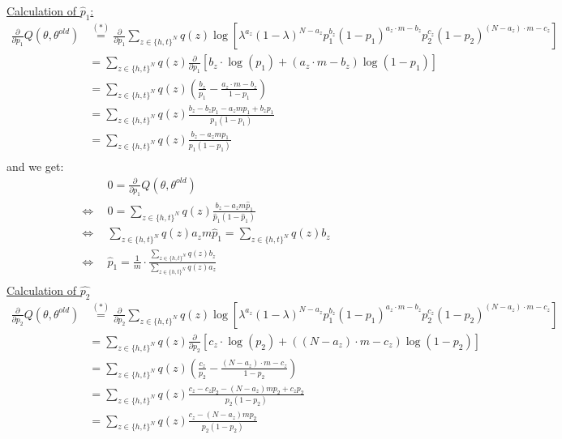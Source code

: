 \documentclass{article}
\begin{document}
\underline{Calculation of $\hat{p}_1$:}
\begin{align*}
\frac{\partial}{\partial p_1}Q(\theta,\theta^{old})& \stackrel{(*)}{=}  \frac{\partial}{\partial p_1} \sum \limits _{z \in \{h, t\}^N} q(z)\log [ 
\lambda^{a_z} (1  - \lambda)^{N - a_z} p_1^{b_z}(1 - p_1)^{a_z \cdot m - b_z} p_2^{c_z}(1 - p_2)^{(N - a_z) \cdot m - c_z} ]&\\
&=  \sum \limits _{z \in \{h, t\}^N} q(z) \frac{\partial}{\partial p_1} [ b_z \cdot \log( 
p_1) + (a_z \cdot m - b_z)\log(1  - p_1) ]\\
&=  \sum \limits _{z \in \{h, t\}^N} q(z) \left ( \frac{b_z }{p_1}  - \frac{a_z \cdot m - b_z}{1- p_1} \right )\\
&=  \sum \limits _{z \in \{h, t\}^N} q(z)  \frac{b_z - b_z p_1 - a_z m p_1 + b_z p_1}{p_1(1- p_1)}\\
&=  \sum \limits _{z \in \{h, t\}^N} q(z)  \frac{b_z - a_z m p_1 }{p_1(1- p_1)}\\
\end{align*}
and we get:\\
\begin{align*}
                 &0 =  \frac{\partial}{\partial p_1}Q(\theta,\theta^{old}) &\\
\Leftrightarrow ~~&0 = \sum \limits _{z \in \{h, t\}^N} q(z)  \frac{b_z - a_z m \hat{p}_1}{\hat{p}_1(1- \hat{p}_1)}\\
\Leftrightarrow ~~&\sum \limits _{z \in \{h, t\}^N} q(z) a_z m \hat{p}_1= \sum \limits _{z \in \{h, t\}^N} q(z) b_z\\
\Leftrightarrow ~~&  \hat{p}_1= \frac{1}{m} \cdot \frac{ \sum \limits _{z \in \{h, t\}^N} q(z) b_z}{\sum \limits _{z \in \{h, t\}^N} q(z) a_z}\\
\end{align*}
\underline{Calculation of $\hat{p_2}$}
\begin{align*}
\frac{\partial}{\partial p_2}Q(\theta,\theta^{old})& \stackrel{(*)}{=}  \frac{\partial}{\partial p_2} \sum \limits _{z \in \{h, t\}^N} q(z)\log [ 
\lambda^{a_z} (1  - \lambda)^{N - a_z} p_1^{b_z}(1 - p_1)^{a_z \cdot m - b_z} p_2^{c_z}(1 - p_2)^{(N - a_z) \cdot m - c_z} ]&\\
&=  \sum \limits _{z \in \{h, t\}^N} q(z) \frac{\partial}{\partial p_2} [ c_z \cdot \log( 
p_2) + ((N - a_z) \cdot m - c_z)\log(1  - p_2) ]\\
&=  \sum \limits _{z \in \{h, t\}^N} q(z) \left ( \frac{c_z }{p_2} - \frac{ (N - a_z) \cdot m - c_z}{1  - p_2} \right ) \\
&=  \sum \limits _{z \in \{h, t\}^N} q(z)  \frac{c_z  - c_zp_2 - (N - a_z)mp_2 + c_z p_2}{p_2(1  - p_2)}\\
&=  \sum \limits _{z \in \{h, t\}^N} q(z)  \frac{c_z  - (N - a_z)mp_2}{p_2(1  - p_2)}\\
\end{align*}
\end{document}
